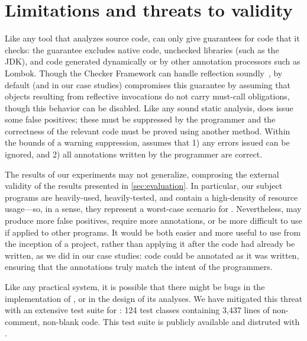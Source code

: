 \section{Limitations and threats to validity}
\label{sec:threats}

Like any tool that analyzes source code, \tool can only
give guarantees for code that it checks: the guarantee
excludes native code, unchecked libraries (such as the JDK),
and code generated dynamically or by other annotation processors
such as Lombok. Though the Checker Framework can handle
reflection soundly~\cite{BarrosJMVDdAE2015}, by default (and in our case studies)
\tool compromises this guarantee
by assuming that objects resulting from reflective invocations
do not carry must-call obligations, though this behavior can
be disabled. Like any sound static analysis, \tool does
issue some false positives; these must be suppressed by
the programmer and the correctness of the relevant code
must be proved using another method. Within the bounds
of a warning suppression, \tool assumes that 1)
any errors issued can be ignored, and 2) all annotations
written by the programmer are correct.

The results of our experiments may not generalize, comprosing the
external validity of the results presented in
\cref{sec:evaluation}. In particular, our subject programs are
heavily-used, heavily-tested, and contain a high-density of resource
usage---so, in a sense, they represent a worst-case scenario for
\tool.  Nevertheless, \tool may produce more false positives, require
more annotations, or be more difficult to use if applied to other
programs.  It would be both easier and more useful to use \tool from
the inception of a project, rather than applying it after the code had
already be written, as we did in our case studies: code could be
annotated as it was written, ensuring that the annotations truly match
the intent of the programmers.

Like any practical system, it is possible that there might
be bugs in the implementation of \tool, or in the design of
its analyses. We have mitigated this threat with an extensive
test suite for \tool:
124 test classes containing
3,437 lines of non-comment, non-blank code.
This test suite is publicly available and distruted with \tool.
